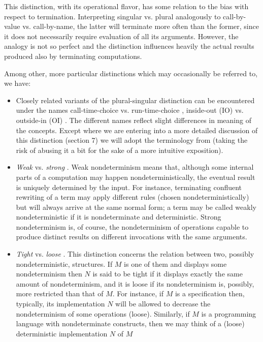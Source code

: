 This distinction, with its operational flavor, has some relation to
the bias with respect to termination. Interpreting singular vs. plural
analogously to call-by-value vs. call-by-name, the latter will
terminate more often than the former, since it does not necessarily
require evaluation of all its arguments. However, the analogy is not
so perfect and the distinction
influences heavily the actual results produced also by terminating computations.

Among other, more particular 
distinctions which may occasionally be referred to, we have:
\begin{itemize}
\item Closely related variants of the plural-singular 
distinction can be encountered under the names call-time-choice vs. 
run-time-choice  \cite{c:26, c:49, c:50}, inside-out (IO) vs. outside-in (OI) 
\cite{c:34, c:35}. The different names reflect slight differences in meaning 
of the concepts. Except where we are entering into a
 more detailed discussion of this distinction (section 7) we will adopt the 
terminology from \cite{c:110} (taking the risk of abusing it a bit for the sake 
of a more intuitive exposition). 
\item {\em Weak} vs. {\em strong} \cite{c:110}. 
Weak nondeterminism means that, although some internal parts 
of a computation may happen nondeterministically, the eventual result 
is uniquely determined by the input. For instance, terminating confluent 
rewriting of a term may apply different rules (chosen nondeterministically) 
but will always arrive at the same normal form; a 
term may be called weakly nondeterministic if it is nondeterminate 
and deterministic. Strong nondeterminism is, of course, the 
nondeterminism of operations capable to produce distinct results on
different invocations with the same arguments.
\item {\em Tight} vs. {\em loose} \cite{c:99, c:21, c:110}. 
This distinction concerns the relation between two, possibly 
nondeterministic, structures. If $M$ is one of them and displays 
some nondeterminism then $N$
 is said to be tight if it displays exactly the same amount of 
nondeterminism, and it is loose if its nondeterminism is, possibly, 
more restricted than that of $M$. For instance, if $M$ is a 
specification then, typically, its implementation $N$
 will be allowed to decrease the nondeterminism of some operations 
(loose). Similarly, if $M$ is a programming language with 
nondeterminate constructs, then we may think of a (loose) 
deterministic implementation $N$ of $M$

\end{itemize}
